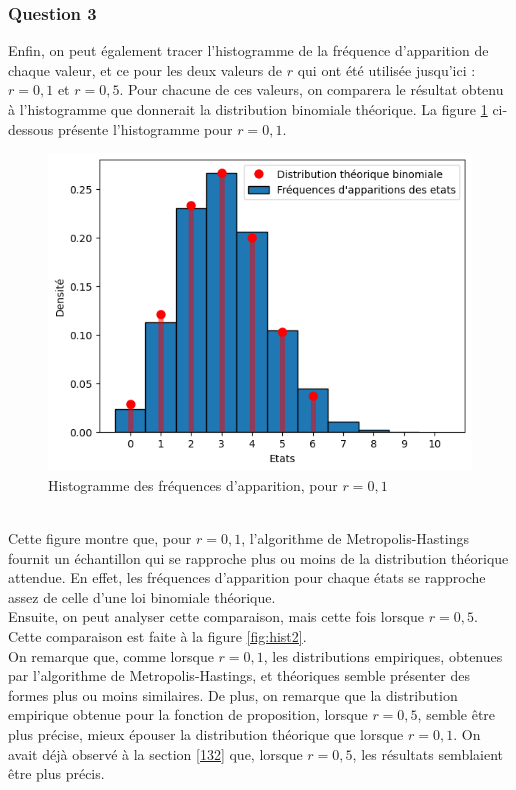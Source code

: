 \documentclass[a4paper, 11pt]{article}
\begin{document}
\subsubsection{Question 3}
Enfin, on peut également tracer l'histogramme de la fréquence d'apparition de chaque valeur, et ce pour les deux valeurs de $r$ qui ont été utilisée jusqu'ici : $r=0,1$ et $r=0,5$. Pour chacune de ces valeurs, on comparera le résultat obtenu à l'histogramme que donnerait la distribution binomiale théorique. La figure \ref{fig:hist1} ci-dessous présente l'histogramme pour $r=0,1$.
\begin{figure}[h!]
    \centering
    \includegraphics[scale=0.8]{hist_r_01.png}
    \caption{Histogramme des fréquences d'apparition, pour $r=0,1$}
    \label{fig:hist1}
\end{figure}\\

Cette figure montre que, pour $r=0,1$, l'algorithme de Metropolis-Hastings fournit un échantillon qui se rapproche plus ou moins de la distribution théorique attendue. En effet, les fréquences d'apparition pour chaque états se rapproche assez de celle d'une loi binomiale théorique.\\

Ensuite, on peut analyser cette comparaison, mais cette fois lorsque $r=0,5$. Cette comparaison est faite à la figure \ref{fig:hist2}. \\

On remarque que, comme lorsque $r=0,1$, les distributions empiriques, obtenues par l'algorithme de Metropolis-Hastings, et théoriques semble présenter des formes plus ou moins similaires. De plus, on remarque que la distribution empirique obtenue pour la fonction de proposition, lorsque $r=0,5$, semble être plus précise, mieux épouser la distribution théorique que lorsque $r=0,1$. On avait déjà observé à la section \ref{132} que, lorsque $r=0,5$, les résultats semblaient être plus précis.
\end{document}
